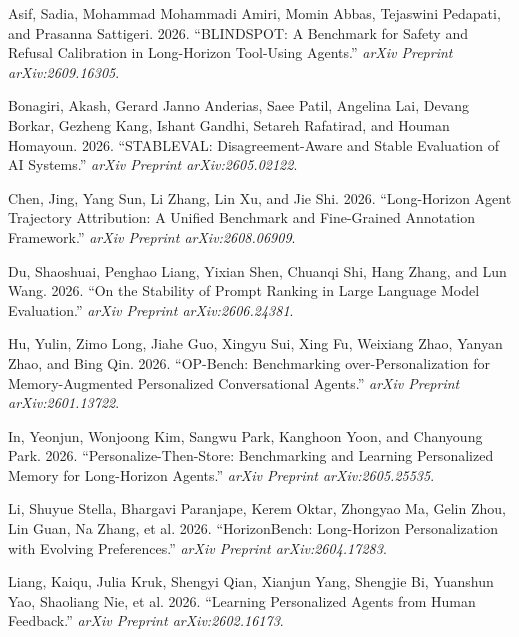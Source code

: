 \documentclass[
  10pt,
  letterpaper,
]{article}
\newlength{\cslhangindent}
\newenvironment{CSLReferences}[2] %
 {\begin{list}{}{%
  \setlength{\itemindent}{0pt}
  \setlength{\leftmargin}{0pt}
  \setlength{\parsep}{0pt}
  \ifodd #1
   \setlength{\leftmargin}{\cslhangindent}
   \setlength{\itemindent}{-1\cslhangindent}
  \fi
  \setlength{\itemsep}{#2\baselineskip}}}
 {\end{list}}
\begin{document}
\label{refs}
\begin{CSLReferences}{1}{0}
Asif, Sadia, Mohammad Mohammadi Amiri, Momin Abbas, Tejaswini Pedapati,
and Prasanna Sattigeri. 2026. {``BLINDSPOT: A Benchmark for Safety and
Refusal Calibration in Long-Horizon Tool-Using Agents.''} \emph{arXiv
Preprint arXiv:2609.16305}.

Bonagiri, Akash, Gerard Janno Anderias, Saee Patil, Angelina Lai, Devang
Borkar, Gezheng Kang, Ishant Gandhi, Setareh Rafatirad, and Houman
Homayoun. 2026. {``STABLEVAL: Disagreement-Aware and Stable Evaluation
of AI Systems.''} \emph{arXiv Preprint arXiv:2605.02122}.

Chen, Jing, Yang Sun, Li Zhang, Lin Xu, and Jie Shi. 2026.
{``Long-Horizon Agent Trajectory Attribution: A Unified Benchmark and
Fine-Grained Annotation Framework.''} \emph{arXiv Preprint
arXiv:2608.06909}.

Du, Shaoshuai, Penghao Liang, Yixian Shen, Chuanqi Shi, Hang Zhang, and
Lun Wang. 2026. {``On the Stability of Prompt Ranking in Large Language
Model Evaluation.''} \emph{arXiv Preprint arXiv:2606.24381}.

Hu, Yulin, Zimo Long, Jiahe Guo, Xingyu Sui, Xing Fu, Weixiang Zhao,
Yanyan Zhao, and Bing Qin. 2026. {``OP-Bench: Benchmarking
over-Personalization for Memory-Augmented Personalized Conversational
Agents.''} \emph{arXiv Preprint arXiv:2601.13722}.

In, Yeonjun, Wonjoong Kim, Sangwu Park, Kanghoon Yoon, and Chanyoung
Park. 2026. {``Personalize-Then-Store: Benchmarking and Learning
Personalized Memory for Long-Horizon Agents.''} \emph{arXiv Preprint
arXiv:2605.25535}.

Li, Shuyue Stella, Bhargavi Paranjape, Kerem Oktar, Zhongyao Ma, Gelin
Zhou, Lin Guan, Na Zhang, et al. 2026. {``HorizonBench: Long-Horizon
Personalization with Evolving Preferences.''} \emph{arXiv Preprint
arXiv:2604.17283}.

Liang, Kaiqu, Julia Kruk, Shengyi Qian, Xianjun Yang, Shengjie Bi,
Yuanshun Yao, Shaoliang Nie, et al. 2026. {``Learning Personalized
Agents from Human Feedback.''} \emph{arXiv Preprint arXiv:2602.16173}.


\end{CSLReferences}
\end{document}
